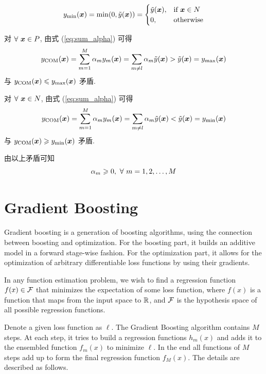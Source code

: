 \documentclass{article}
\begin{document}
\begin{equation}
  y_{\min}(\bm{x})=\min(0,\tilde{y}(\bm{x}))
  =\begin{cases}
    \tilde{y}(\bm{x}), &\text{if}~\bm{x}\in N\\
    0, &\text{otherwise}\\
  \end{cases}
\end{equation}

对 $\forall~\bm{x}\in P$, 由式 (\ref{eq:sum_alpha}) 可得
\begin{equation}
  y_{\text{COM}}(\bm{x})
  =\sum_{m=1}^{M}\alpha_{m}y_{m}(\bm{x})
  =\sum_{m\neq l}\alpha_{m}\tilde{y}(\bm{x})
  >\tilde{y}(\bm{x})=y_{\max}(\bm{x})
\end{equation}
与 $y_{\text{COM}}(\bm{x})\leqslant y_{\max}(\bm{x})$ 矛盾.

对 $\forall~\bm{x}\in N$, 由式 (\ref{eq:sum_alpha}) 可得
\begin{equation}
  y_{\text{COM}}(\bm{x})
  =\sum_{m=1}^{M}\alpha_{m}y_{m}(\bm{x})
  =\sum_{m\neq l}\alpha_{m}\tilde{y}(\bm{x})
  <\tilde{y}(\bm{x})=y_{\min}(\bm{x})
\end{equation}
与 $y_{\text{COM}}(\bm{x})\geqslant y_{\min}(\bm{x})$ 矛盾.

由以上矛盾可知
\begin{equation}
  \alpha_{m}\geqslant0,~\forall~m=1,2,\dots,M
\end{equation}

\section*{Gradient Boosting}

Gradient boosting is a generation of boosting algorithms, using the connection between boosting and optimization. For the boosting part, it builds an additive model in a forward stage-wise fashion. For the optimization part, it allows for the optimization of arbitrary differentiable loss functions by using their gradients.

In any function estimation problem, we wish to find a regression function $f(x)\in\mathcal{F}$ that minimizes the expectation of some loss function, where $f(x)$ is a function that maps from the input space to $\mathbb{R}$, and $\mathcal{F}$ is the hypothesis space of all possible regression functions.

Denote a given loss function as $\ell$.
The Gradient Boosting algorithm contains $M$ steps. At each step, it tries to build a regression functions $h_m(x)$ and adds it to the ensembled function $f_m(x)$ to minimize $\ell$. In the end all functions of $M$ steps add up to form the final regression function $f_M(x)$. The details are described as follows. 
\end{document}
